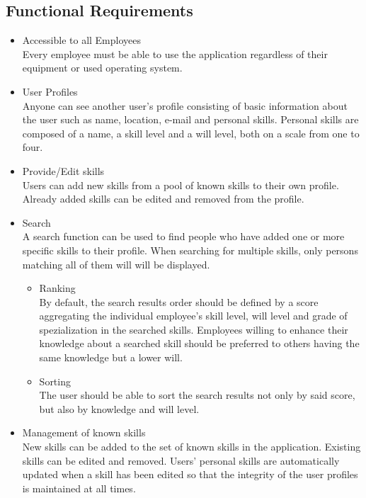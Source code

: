 \subsection{Functional Requirements}
\begin{itemize}
 	\item Accessible to all Employees\\
	Every employee must be able to use the application regardless of their equipment or used operating system.
	\item User Profiles \\
	Anyone can see another user’s profile consisting of basic information about the user such as name, location, e-mail and personal skills. Personal skills are composed of a name, a skill level and a will level, both on a scale from one to four.
	\item Provide/Edit skills\\
	Users can add new skills from a pool of known skills to their own profile. Already added skills can be edited and removed from the profile.
	\item Search\\
	A search function can be used to find people who have added one or more specific skills to their profile. When searching for multiple skills, only persons matching all of them will will be displayed.
	\begin{itemize}
		\item Ranking\\
			By default, the search results order should be defined by a score aggregating the individual employee's skill level, will level and grade of spezialization in the searched skills. Employees willing to enhance their knowledge about a searched skill should be preferred to others having the same knowledge but a lower will.
		\item Sorting\\
			The user should be able to sort the search results not only by said score,
			but also by knowledge and will level.
	\end{itemize}
	\item Management of known skills\\
	New skills can be added to the set of known skills in the application. Existing skills can be edited and removed. Users' personal skills are automatically updated when a skill has been edited so that the integrity of the user profiles is maintained at all times.
\end{itemize}

